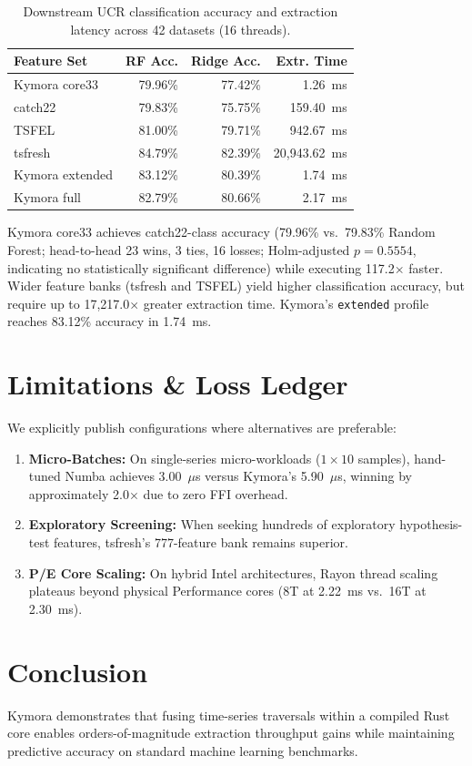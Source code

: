 \documentclass[10pt,twocolumn,letterpaper]{article}
\begin{document}
\begin{table}[h]
\centering
\small
\caption{Downstream UCR classification accuracy and extraction latency across 42 datasets (16 threads).}
\label{tab:ucr}
\begin{tabular}{lrrr}
\toprule
\textbf{Feature Set} & \textbf{RF Acc.} & \textbf{Ridge Acc.} & \textbf{Extr. Time} \\
\midrule
Kymora core33   & 79.96\% & 77.42\% & 1.26~ms \\
catch22         & 79.83\% & 75.75\% & 159.40~ms \\
TSFEL           & 81.00\% & 79.71\% & 942.67~ms \\
tsfresh         & 84.79\% & 82.39\% & 20,943.62~ms \\
\midrule
Kymora extended & 83.12\% & 80.39\% & 1.74~ms \\
Kymora full     & 82.79\% & 80.66\% & 2.17~ms \\
\bottomrule
\end{tabular}
\end{table}

Kymora core33 achieves catch22-class accuracy (79.96\% vs.\ 79.83\% Random Forest; head-to-head 23 wins, 3 ties, 16 losses; Holm-adjusted $p=0.5554$, indicating no statistically significant difference) while executing 117.2$\times$ faster. Wider feature banks (tsfresh and TSFEL) yield higher classification accuracy, but require up to 17,217.0$\times$ greater extraction time. Kymora's \texttt{extended} profile reaches 83.12\% accuracy in 1.74~ms.

\section{Limitations \& Loss Ledger}
We explicitly publish configurations where alternatives are preferable:
\begin{enumerate}
    \item \textbf{Micro-Batches:} On single-series micro-workloads ($1 \times 10$ samples), hand-tuned Numba achieves 3.00~$\mu$s versus Kymora's 5.90~$\mu$s, winning by approximately 2.0$\times$ due to zero FFI overhead.
    \item \textbf{Exploratory Screening:} When seeking hundreds of exploratory hypothesis-test features, tsfresh's 777-feature bank remains superior.
    \item \textbf{P/E Core Scaling:} On hybrid Intel architectures, Rayon thread scaling plateaus beyond physical Performance cores (8T at 2.22~ms vs.\ 16T at 2.30~ms).
\end{enumerate}

\section{Conclusion}
Kymora demonstrates that fusing time-series traversals within a compiled Rust core enables orders-of-magnitude extraction throughput gains while maintaining predictive accuracy on standard machine learning benchmarks.



\end{document}

